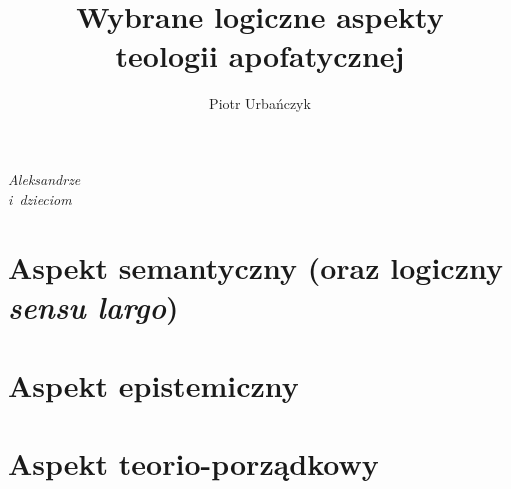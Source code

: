 \documentclass[12pt,a4paper,openany,oneside,leqno,titlepage]{report}
\title{Wybrane logiczne aspekty\\teologii apofatycznej}
\author{Piotr Urbańczyk}
\theoremstyle{definition}
\begin{document}



\stronatytulowa

\thispagestyle{empty}
\vspace*{17cm}
\begin{flushright}
\textit{Aleksandrze\\i~dzieciom}
\end{flushright}
\newpage


\stronanumerdwa


\tableofcontents

\cleardoublepage





\part{Aspekt semantyczny (oraz logiczny \textit{sensu largo})}





\part{Aspekt epistemiczny}



\part{Aspekt teorio-porządkowy}


\end{document}
